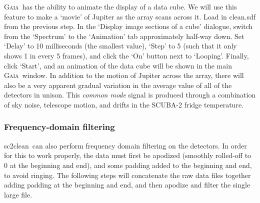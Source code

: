 \documentclass[twoside,11pt]{article}
\newcommand{\gaia}{\xref{\textsc{Gaia}}{sun214}{}}
\newcommand{\task}[1]{\textsf{#1}}
\newcommand{\clean}{\xref{\task{sc2clean}}{sun258}{SC2CLEAN}}
\newcommand{\xref}[3]{#1}
\newcommand{\xlabel}[1]{}
\renewcommand{\_}{\texttt{\symbol{95}}}
\begin{document}
\gaia\ has the ability to animate the display of a data cube. We will
use this feature to make a `movie' of Jupiter as the array scans
across it. Load in clean.sdf from the previous step. In the `Display
image sections of a cube' dialogue, switch from the `Spectrum' to the
`Animation' tab approximately half-way down.  Set `Delay' to 10
milliseconds (the smallest value), `Step' to 5 (such that it only
shows 1 in every 5 frames), and click the `On' button next to
`Looping'. Finally, click `Start', and an animation of the data cube
will be shown in the main \gaia\ window. In addition to the motion of
Jupiter across the array, there will also be a very apparent gradual
variation in the average value of all of the detectors in unison. This
{\em common mode} signal is produced through a combination of sky
noise, telescope motion, and drifts in the SCUBA-2 fridge temperature.

\subsubsection{\xlabel{fftfilter}Frequency-domain filtering} 

\clean\ can also perform frequency domain filtering on the
detectors. In order for this to work properly, the data must first be
apodized (smoothly rolled-off to 0 at the beginning and end), and some
padding added to the beginning and end, to avoid ringing. The
following steps will concatenate the raw data files together adding
padding at the beginning and end, and then apodize and filter the
single large file.
\end{document}
